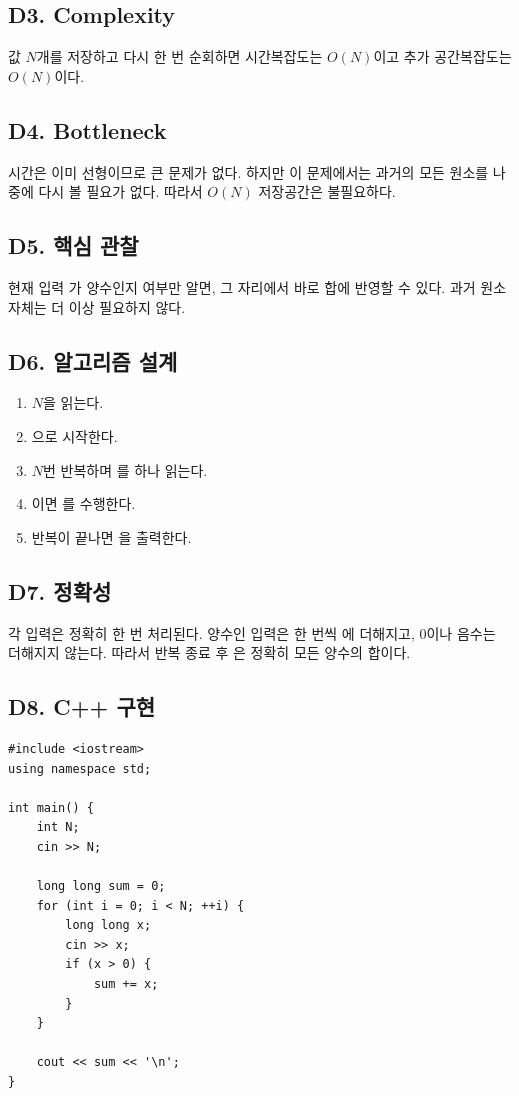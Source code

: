 \subsection*{D3. Complexity}
값 $N$개를 저장하고 다시 한 번 순회하면 시간복잡도는 $O(N)$이고 추가 공간복잡도는 $O(N)$이다.

\subsection*{D4. Bottleneck}
시간은 이미 선형이므로 큰 문제가 없다. 하지만 이 문제에서는 과거의 모든 원소를 나중에 다시 볼 필요가 없다. 따라서 $O(N)$ 저장공간은 불필요하다.

\subsection*{D5. 핵심 관찰}
현재 입력 가 양수인지 여부만 알면, 그 자리에서 바로 합에 반영할 수 있다. 과거 원소 자체는 더 이상 필요하지 않다.

\subsection*{D6. 알고리즘 설계}
\begin{enumerate}
  \item $N$을 읽는다.
  \item {}으로 시작한다.
  \item $N$번 반복하며 를 하나 읽는다.
  \item {}이면 를 수행한다.
  \item 반복이 끝나면 을 출력한다.
\end{enumerate}

\subsection*{D7. 정확성}
각 입력은 정확히 한 번 처리된다. 양수인 입력은 한 번씩 에 더해지고, 0이나 음수는 더해지지 않는다. 따라서 반복 종료 후 은 정확히 모든 양수의 합이다.

\subsection*{D8. C++ 구현}
\begin{lstlisting}
#include <iostream>
using namespace std;

int main() {
    int N;
    cin >> N;

    long long sum = 0;
    for (int i = 0; i < N; ++i) {
        long long x;
        cin >> x;
        if (x > 0) {
            sum += x;
        }
    }

    cout << sum << '\n';
}
\end{lstlisting}

